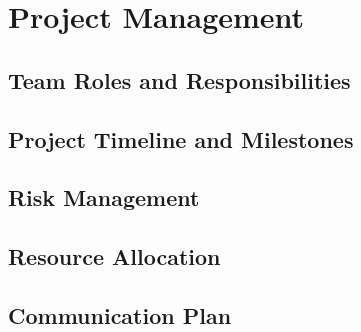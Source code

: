 \chapter{Project Management}

\section{Team Roles and Responsibilities}

\section{Project Timeline and Milestones}

\section{Risk Management}

\section{Resource Allocation}

\section{Communication Plan}
